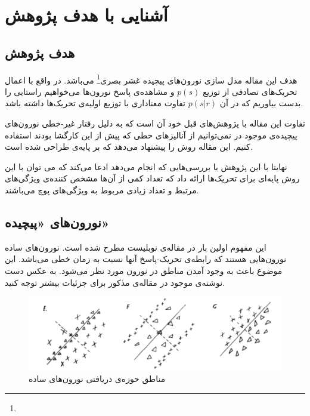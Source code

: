 \documentclass[12pt,onecolumn,a4paper,fleqn]{article}
\begin{document}
	\neurotitlepage

\section{آشنایی با هدف پژوهش}

\subsection{هدف پژوهش}
هدف این مقاله مدل سازی  نورون‌های پیچیده‌ غشر بصری\footnote{} می‌باشد. در واقع با اعمال تحریک‌های تصادفی  از توزیع 
$p(s)$
و مشاهده‌ی پاسخ نورون‌ها می‌خواهیم راستایی را بدست بیاوریم که در آن $p(s|r)$ تفاوت معناداری با توزیع اولیه‌ی تحریک‌ها داشته باشد.

تفاوت این مقاله با پژوهش‌های قبل خود آن است که به دلیل رفتار غیر-خطی نورون‌های پیچیده‌ی موجود در   نمی‌توانیم از آنالیز‌های خطی 
که پیش از این کارگشا بودند استفاده کنیم. این مقاله روش 
 را پیشنهاد می‌دهد که بر پایه‌ی  طراحی شده است.

نهایتا با این پژوهش با بررسی‌هایی که انجام می‌دهد ادعا می‌کند که می توان  با این روش پایه‌ای برای تحریک‌ها ارائه داد که تعداد کمی از آن‌ها مشخص کننده‌ی ویژگی‌های مرتبط و تعداد زیادی مربوط به ویژگی‌های پوچ می‌باشند.
\subsection{نورون‌های‌ «پیچیده»}
این مفهوم اولین بار در مقاله‌ی نوبلیست  مطرح شده است. نورون‌های ساده نورون‌هایی هستند که رابطه‌ی تحریک-پاسخ آنها نسبت به زمان خطی می‌باشد. این موضوع باعث به وجود آمدن مناطق  در  نورون مورد نظر می‌شود. به عکس دست نوشته‌ی موجود در مقاله‌ی مذکور برای جزئیات بیشتر توجه کنید.

\begin{figure}[h]
	\centering
	\includegraphics[width=0.8\linewidth]{photos/simple_cells.png}
  \caption[]{مناطق  حوزه‌ی دریافتی نورون‌های ساده\footnotemark}
\end{figure}
\end{document}

